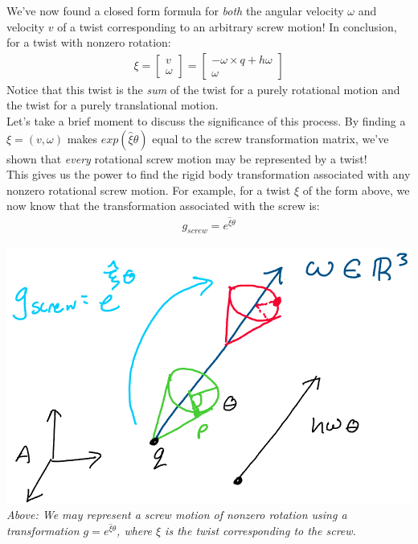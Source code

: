 \documentclass[oneside]{book}
\begin{document}
We've now found a closed form formula for \textit{both} the angular velocity $\omega$ and velocity $v$ of a twist corresponding to an arbitrary screw motion! In conclusion, for a twist with nonzero rotation:
\begin{align}
    \xi = \begin{bmatrix}
    v\\
    \omega
    \end{bmatrix}
    = 
    \begin{bmatrix}
    -\omega \times q + h\omega\\
    \omega
    \end{bmatrix}
\end{align}
Notice that this twist is the \textit{sum} of the twist for a purely rotational motion and the twist for a purely translational motion.\\
Let's take a brief moment to discuss the significance of this process. By finding a $\xi = (v, \omega)$ makes $exp(\hat\xi\theta)$ equal to the screw transformation matrix, we've shown that \textit{every} rotational screw motion may be represented by a twist!\\
This gives us the power to find the rigid body transformation associated with any nonzero rotational screw motion. For example, for a twist $\xi$ of the form above, we now know that the transformation associated with the screw is:
\begin{align}
    g_{screw} = e^{\hat\xi\theta}
\end{align}
\begin{center}
    \includegraphics[scale=0.5]{images/screwG.png}\\
    \textit{Above: We may represent a screw motion of nonzero rotation using a transformation $g = e^{\hat\xi\theta}$, where $\xi$ is the twist corresponding to the screw.}
\end{center}
\end{document}
